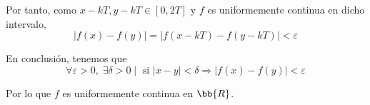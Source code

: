 \begin{ejercicio}
\begin{enumerate}
        Por tanto, como $x-kT, y-kT \in [0,2T]$ y $f$ es uniformemente continua en dicho intervalo,
        \begin{equation*}
            |f(x)-f(y)| = |f(x-kT) - f(y-kT)| < {\varepsilon}
        \end{equation*}

        En conclusión, tenemos que
        \begin{equation*}
            \forall \varepsilon>0,\;\exists \delta>0 \mid  \text{ si } |x-y|<\delta \Longrightarrow |f(x)-f(y)| < \varepsilon
        \end{equation*}

        Por lo que $f$ es uniformemente continua en $\bb{R}$.
    \end{enumerate}
\end{ejercicio}

